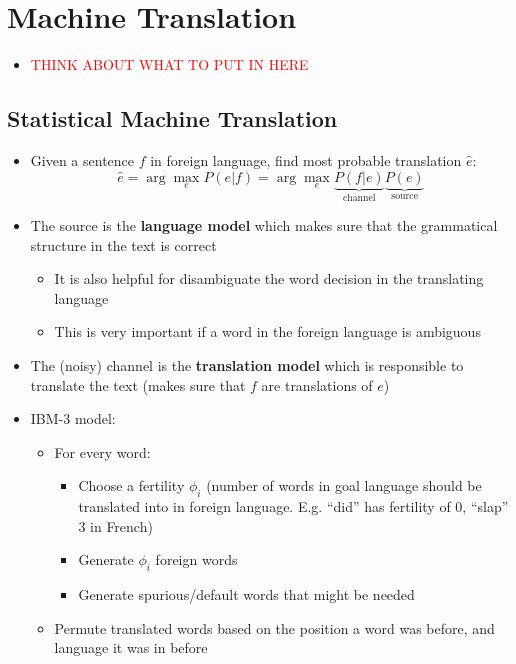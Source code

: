 \section{Machine Translation}
\begin{itemize}
	\item \textcolor{red}{THINK ABOUT WHAT TO PUT IN HERE}
\end{itemize}
\subsection{Statistical Machine Translation}
\begin{itemize}
	\item Given a sentence $f$ in foreign language, find most probable translation $\hat{e}$:
	$$\hat{e} = \arg\max_{e} P(e|f) = \arg\max_{e} \underbrace{P(f|e)}_{\text{channel}} \underbrace{P(e)}_{\text{source}}$$
	\item The source is the \textbf{language model} which makes sure that the grammatical structure in the text is correct
	\begin{itemize}
		\item It is also helpful for disambiguate the word decision in the translating language
		\item This is very important if a word in the foreign language is ambiguous
	\end{itemize}
	\item The (noisy) channel is the \textbf{translation model} which is responsible to translate the text (makes sure that $f$ are translations of $e$)
	\item IBM-3 model:
	\begin{itemize}
		\item For every word:
		\begin{itemize}
			\item Choose a fertility $\phi_i$ (number of words in goal language should be translated into in foreign language. E.g. ``did'' has fertility of 0, ``slap'' 3 in French)
			\item Generate $\phi_i$ foreign words
			\item Generate spurious/default words that might be needed
		\end{itemize}
		\item Permute translated words based on the position a word was before, and language it was in before
	\end{itemize}
\end{itemize}
